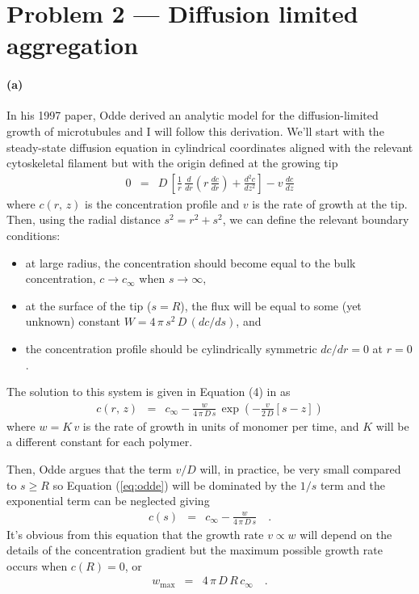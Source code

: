 \documentclass[12pt]{article}
\newcommand{\eq}[1]{Equation (\ref{eq:#1})}
\newcommand{\eqlabel}[1]{\label{eq:#1}}
\begin{document}
\section{Problem 2 --- Diffusion limited aggregation}

\paragraph{(a)}

In his 1997 paper, Odde \cite{odde} derived an analytic model for the
diffusion-limited growth of microtubules and I will follow this derivation.
We'll start with the steady-state diffusion equation in cylindrical
coordinates aligned with the relevant cytoskeletal filament but with the
origin defined at the growing tip
\begin{eqnarray}
0 &=& D\,\left[
\frac{1}{r}\,\frac{d}{dr} \left(r\,\frac{dc}{dr}\right) + \frac{d^2c}{dz^2}
\right] - v\,\frac{dc}{dz}
\end{eqnarray}
where $c(r,\,z)$ is the concentration profile and $v$ is the rate of growth at
the tip.
Then, using the radial distance $s^2=r^2+s^2$, we can define the relevant
boundary conditions:
\begin{itemize}
\item at large radius, the concentration should become equal to the bulk
concentration, $c\to c_\infty$ when $s\to\infty$,
\item at the surface of the tip ($s = R$), the flux will
be equal to some (yet unknown) constant $W = 4\,\pi\,s^2\,D\,(dc/ds)$, and
\item the concentration profile should be cylindrically symmetric $dc/dr=0$
at $r=0$.
\end{itemize}
The solution to this system is given in Equation (4) in \cite{odde} as
\begin{eqnarray}\eqlabel{odde}
c(r,\,z) &=& c_\infty - \frac{w}{4\,\pi\,D\,s}\,\exp\left( -\frac{v}{2\,D}
    \left[ s-z \right] \right)
\end{eqnarray}
where $w = K\,v$ is the rate of growth in units of monomer per time, and $K$
will be a different constant for each polymer.

Then, Odde argues that the term $v / D$ will, in practice, be very small
compared to $s \ge R$ so \eq{odde} will be dominated by the $1/s$ term and the
exponential term can be neglected giving
\begin{eqnarray}
c(s) &=& c_\infty - \frac{w}{4\,\pi\,D\,s} \quad.
\end{eqnarray}
It's obvious from this equation that the growth rate $v \propto w$ will depend
on the details of the concentration gradient but the maximum possible growth
rate occurs when $c(R) = 0$, or
\begin{eqnarray}
w_\mathrm{max} &=& 4\,\pi\,D\,R\,c_\infty \quad.
\end{eqnarray}
\end{document}
